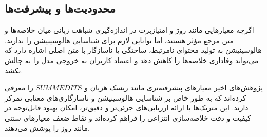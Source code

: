 \subsection{محدودیت‌ها و پیشرفت‌ها}

اگرچه معیارهایی مانند روژ و امتیازبرت در اندازه‌گیری شباهت زبانی میان خلاصه‌ها و متن مرجع مؤثر هستند، اما توانایی لازم برای شناسایی هالوسینیشن را ندارند. هالوسینیشن به تولید محتوای نامرتبط، ساختگی یا ناسازگار با متن اصلی اشاره دارد که می‌تواند وفاداری خلاصه‌ها را کاهش دهد و اعتماد کاربران به خروجی مدل را به چالش بکشد.


پژوهش‌های اخیر معیارهای پیشرفته‌تری مانند ریسک هزیان و $SUMMEDITS$ را معرفی کرده‌اند که به طور خاص بر شناسایی هالوسینیشن و ناسازگاری‌های معنایی تمرکز دارند.  این متریک‌ها با ارائه ارزیابی‌های جزئی‌تر و دقیق‌تر، امکان بهبود قابل‌توجه در کیفیت و دقت خلاصه‌سازی انتزاعی را فراهم کرده‌اند و نقاط ضعف معیارهای سنتی مانند روژ را پوشش می‌دهند.










